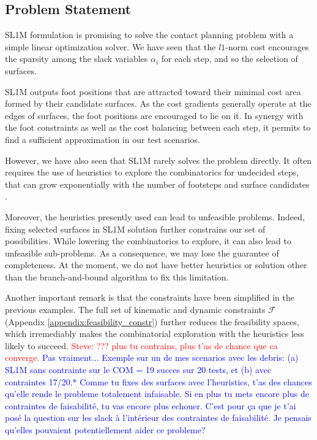 \subsection{Problem Statement}
SL1M formulation is promising to solve the contact planning problem with a simple linear optimization solver.
We have seen that the $l1$-norm cost encourages the sparsity among the slack variables $\alpha_i$ for each step, and so the selection of surfaces.

SL1M outputs foot positions that are attracted toward their minimal cost area formed by their candidate surfaces.
As the cost gradients generally operate at the edges of surfaces, the foot positions are encouraged to lie on it.
In synergy with the foot constraints as well as the cost balancing between each step, it permits to find a sufficient approximation in our test scenarios.

However, we have also seen that SL1M rarely solves the problem directly. 
It often requires the use of heuristics to explore the combinatorics for undecided steps, that can grow exponentially with the number of footsteps and surface candidates \cite{sl1m_v1}.

Moreover, the heuristics presently used can lead to unfeasible problems. 
Indeed, fixing selected surfaces in SL1M solution further constrains our set of possibilities. While lowering the combinatorics to explore, it can also lead to unfeasible sub-problems. As a consequence, we may lose the guarantee of completeness.
At the moment, we do not have better heuristics or solution other than the branch-and-bound algorithm to fix this limitation.

Another important remark is that the constraints have been simplified in the previous examples.
The full set of kinematic and dynamic constraints $\mathcal{F}$ (Appendix \ref{appendix:feasibility_constr}) further reduces the feasibility spaces, which irremediably makes the combinatorial exploration with the heuristics less likely to succeed.
\textcolor{red}{Steve: ??? plus tu contrains, plus t'as de chance que ca converge.} \textcolor{blue}{Pas vraiment... Exemple sur un de mes scenarios avec les debris: (a) SL1M sans contrainte sur le COM = 19 succes sur 20 tests, et (b) avec contraintes 17/20.*
Comme tu fixes des surfaces avec l'heuristics, t'as des chances qu'elle rende le probleme totalement infaisable. Si en plus tu mets encore plus de contraintes de faisabilité, tu vas encore plus echouer.
C'est pour ça que je t'ai posé la question sur les slack à l'intérieur des contraintes de faisabilité. Je pensais qu'elles pouvaient potentiellement aider ce probleme?}

